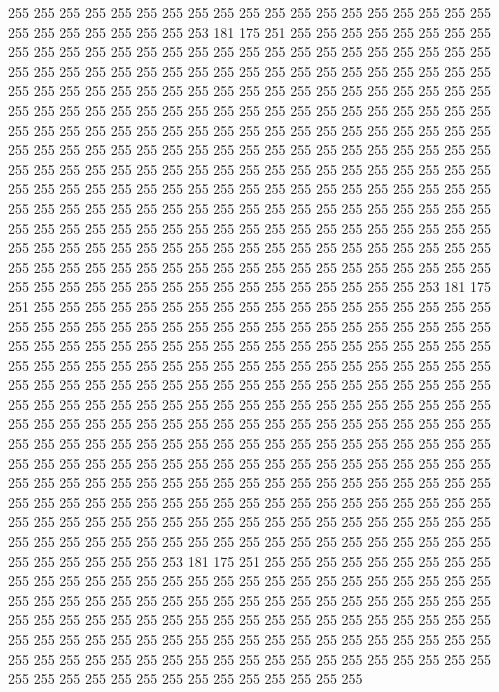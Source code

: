 255 255 255 255 255 255 255 255 255 255 255 255 255 255 255 255 255 255 255 255
255 255 255 255 255 255 253 181 175 251 255 255 255 255 255 255 255 255 255 255
255 255 255 255 255 255 255 255 255 255 255 255 255 255 255 255 255 255 255 255
255 255 255 255 255 255 255 255 255 255 255 255 255 255 255 255 255 255 255 255
255 255 255 255 255 255 255 255 255 255 255 255 255 255 255 255 255 255 255 255
255 255 255 255 255 255 255 255 255 255 255 255 255 255 255 255 255 255 255 255
255 255 255 255 255 255 255 255 255 255 255 255 255 255 255 255 255 255 255 255
255 255 255 255 255 255 255 255 255 255 255 255 255 255 255 255 255 255 255 255
255 255 255 255 255 255 255 255 255 255 255 255 255 255 255 255 255 255 255 255
255 255 255 255 255 255 255 255 255 255 255 255 255 255 255 255 255 255 255 255
255 255 255 255 255 255 255 255 255 255 255 255 255 255 255 255 255 255 255 255
255 255 255 255 255 255 255 255 255 255 255 255 255 255 255 255 255 255 255 255
255 255 255 255 255 255 255 255 255 255 255 255 255 255 255 255 255 255 255 255
255 255 255 255 255 255 255 255 255 255 255 255 255 255 255 255 255 255 255 255
255 255 253 181 175 251 255 255 255 255 255 255 255 255 255 255 255 255 255 255
255 255 255 255 255 255 255 255 255 255 255 255 255 255 255 255 255 255 255 255
255 255 255 255 255 255 255 255 255 255 255 255 255 255 255 255 255 255 255 255
255 255 255 255 255 255 255 255 255 255 255 255 255 255 255 255 255 255 255 255
255 255 255 255 255 255 255 255 255 255 255 255 255 255 255 255 255 255 255 255
255 255 255 255 255 255 255 255 255 255 255 255 255 255 255 255 255 255 255 255
255 255 255 255 255 255 255 255 255 255 255 255 255 255 255 255 255 255 255 255
255 255 255 255 255 255 255 255 255 255 255 255 255 255 255 255 255 255 255 255
255 255 255 255 255 255 255 255 255 255 255 255 255 255 255 255 255 255 255 255
255 255 255 255 255 255 255 255 255 255 255 255 255 255 255 255 255 255 255 255
255 255 255 255 255 255 255 255 255 255 255 255 255 255 255 255 255 255 255 255
255 255 255 255 255 255 255 255 255 255 255 255 255 255 255 255 255 255 255 255
255 255 255 255 255 255 255 255 255 255 255 255 255 255 255 255 255 255 253 181
175 251 255 255 255 255 255 255 255 255 255 255 255 255 255 255 255 255 255 255
255 255 255 255 255 255 255 255 255 255 255 255 255 255 255 255 255 255 255 255
255 255 255 255 255 255 255 255 255 255 255 255 255 255 255 255 255 255 255 255
255 255 255 255 255 255 255 255 255 255 255 255 255 255 255 255 255 255 255 255
255 255 255 255 255 255 255 255 255 255 255 255 255 255 255 255 255 255 255 255
255 255 255 255 255 255 255 255 255 255 255 255 255 255 255 255 255 255 255 255
